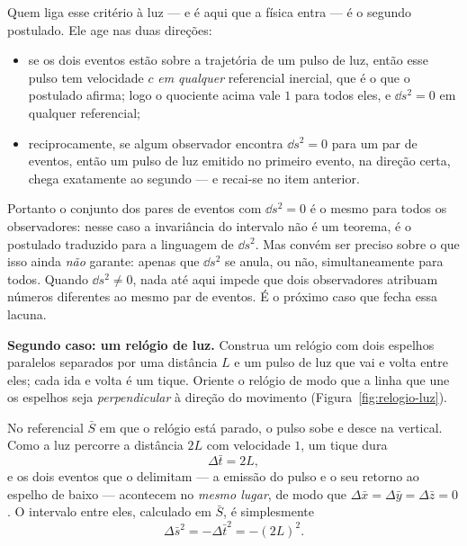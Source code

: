 \documentclass[12pt,a4paper,oneside]{book}
\theoremstyle{rgplain}
\theoremstyle{rgremark}
\begin{document}
Quem liga esse critério à luz --- e é aqui que a física entra --- é o segundo
postulado. Ele age nas duas direções:

\begin{itemize}
  \item se os dois eventos estão sobre a trajetória de um pulso de luz, então
  esse pulso tem velocidade $c$ \emph{em qualquer} referencial inercial, que é
  o que o postulado afirma; logo o quociente acima vale $1$ para todos eles, e
  $\dd s^2=0$ em qualquer referencial;
  \item reciprocamente, se algum observador encontra $\dd s^2=0$ para um par
  de eventos, então um pulso de luz emitido no primeiro evento, na direção
  certa, chega exatamente ao segundo --- e recai-se no item anterior.
\end{itemize}

Portanto o conjunto dos pares de eventos com $\dd s^2=0$ é o mesmo para todos
os observadores: nesse caso a invariância do intervalo não é um teorema, é o
postulado traduzido para a linguagem de $\dd s^2$. Mas convém ser preciso
sobre o que isso ainda \emph{não} garante: apenas que $\dd s^2$ se anula, ou
não, simultaneamente para todos. Quando $\dd s^2\ne0$, nada até aqui impede
que dois observadores atribuam números diferentes ao mesmo par de eventos. É o
próximo caso que fecha essa lacuna.

\textbf{Segundo caso: um relógio de luz.} Construa um relógio com dois
espelhos paralelos separados por uma distância $L$ e um pulso de luz que vai e
volta entre eles; cada ida e volta é um tique. Oriente o relógio de modo que a
linha que une os espelhos seja \emph{perpendicular} à direção do movimento
(Figura~\ref{fig:relogio-luz}).

No referencial $\bar S$ em que o relógio está parado, o pulso sobe e desce na
vertical. Como a luz percorre a distância $2L$ com velocidade $1$, um tique
dura
\[
  \Delta \bar t=2L ,
\]
e os dois eventos que o delimitam --- a emissão do pulso e o seu retorno ao
espelho de baixo --- acontecem no \emph{mesmo lugar}, de modo que
$\Delta \bar x=\Delta \bar y=\Delta \bar z=0$. O intervalo entre eles, calculado em $\bar S$, é
simplesmente
\[
  \Delta \bar s^2=-\Delta \bar t^2=-(2L)^2 .
\]
\end{document}
